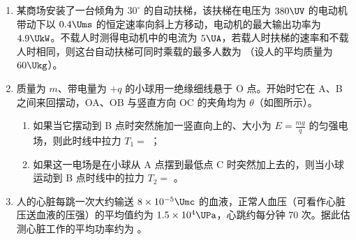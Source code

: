 \documentclass[\gkver]{gaokaozhenti}
\begin{document}
\begin{enumerate}
\onepicture[w=5.5cm, align=right]{}


\item
某商场安装了一台倾角为 $30^{\circ}$ 的自动扶梯，该扶梯在电压为 $380\UV$ 的电动机带动下以 $0.4\Ums$ 的恒定速率向斜上方移动，电动机的最大输出功率为 $4.9\UkW$。不载人时测得电动机中的电流为 $5\UA$，若载人时扶梯的速率和不载人时相同，则这台自动扶梯可同时乘载的最多人数为 （设人的平均质量为 $60\Ukg$）。


\item
质量为 $m$、带电量为 $+q$ 的小球用一绝缘细线悬于 O 点。开始时它在 A、B 之间来回摆动，OA、OB 与竖直方向 OC 的夹角均为 $\theta$（如图所示）。
\begin{enumerate}
	\item
	如果当它摆动到 B 点时突然施加一竖直向上的、大小为 $E = \frac{mg}{q}$ 的匀强电场，则此时线中拉力 $T_{1} =$ ；
	\item
	如果这一电场是在小球从 A 点摆到最低点 C 时突然加上去的，则当小球运动到 B 点时线中的拉力 $T_{2} =$ 。
\end{enumerate}

\onepicture[h=5cm, align=right]{}


\item
人的心脏每跳一次大约输送 $8 \times 10^{-5}\Umc$ 的血液，正常人血压（可看作心脏压送血液的压强）的平均值约为 $1.5 \times 10^{4}\UPa$，心跳约每分钟 70 次。据此估测心脏工作的平均功率约为 \tkanswer[1.9cm]{$1.4\UW$}。


\end{enumerate}
\end{document}
